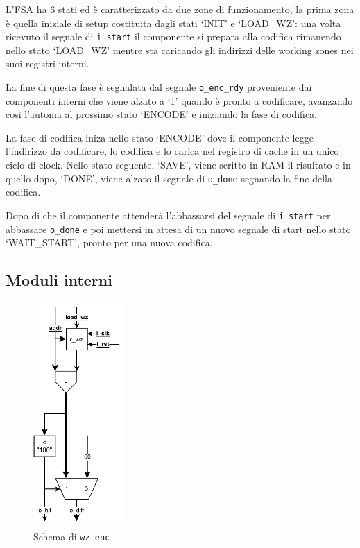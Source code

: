 \documentclass[a4paper]{article}
\begin{document}
L'FSA ha 6 stati ed è caratterizzato da due zone di funzionamento, la prima zona è quella iniziale di setup costituita dagli stati `INIT' e `LOAD\_WZ': una volta ricevuto il segnale di \texttt{i\_start} il componente si prepara alla codifica rimanendo nello stato `LOAD\_WZ' mentre sta caricando gli indirizzi delle working zones nei suoi registri interni.

La fine di questa fase è segnalata dal segnale \texttt{o\_enc\_rdy} proveniente dai componenti interni che viene alzato a `1' quando è pronto a codificare, avanzando così l'automa al prossimo stato `ENCODE' e iniziando la fase di codifica.

La fase di codifica iniza nello stato `ENCODE' dove il componente legge l'indirizzo da codificare, lo codifica e lo carica nel registro di cache in un unico ciclo di clock. Nello stato seguente, `SAVE', viene scritto in RAM il risultato e in quello dopo, `DONE', viene alzato il segnale di \texttt{o\_done} segnando la fine della codifica.

Dopo di che il componente attenderà l'abbassarsi del segnale di \texttt{i\_start} per abbassare \texttt{o\_done} e poi mettersi in attesa di un nuovo segnale di start nello stato `WAIT\_START', pronto per una nuova codifica.

\pagebreak
\subsection{Moduli interni}

\begin{figure}
  \centering
  \includegraphics[width=3.5cm]{schema-wz_enc.pdf}
  \caption{Schema di \texttt{wz\_enc}}
  \label{fig:wz_enc}
\end{figure}
\end{document}
